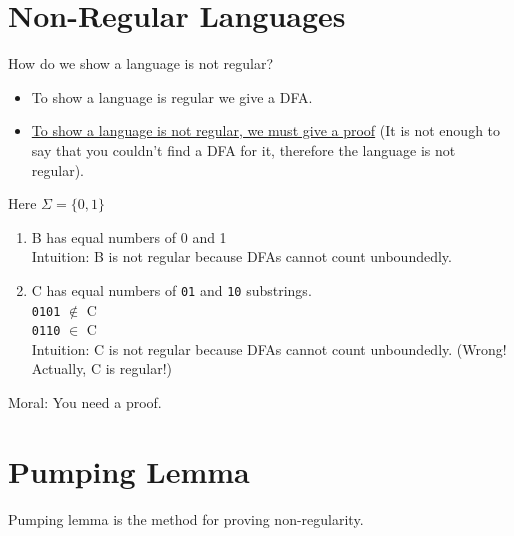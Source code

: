 \section{Non-Regular Languages}
How do we show a language is not regular?
\begin{itemize}
    \item To show a language is regular we give a DFA.
    \item \underline{To show a language is not regular, we must give a proof} (It is not enough to say that you couldn't find a DFA for it, therefore the language is not regular).
\end{itemize}

\begin{eg}
    Here \(\Sigma = \{ 0, 1 \} \) 

    \begin{enumerate}
        \item B has equal numbers of 0 and 1\\
        Intuition: B is not regular because DFAs cannot count unboundedly.
        \item C has equal numbers of \verb|01| and \verb|10| substrings.\\
        \verb|0101| \(\notin\) C \\
        \verb|0110| \(\in\) C\\ 
        Intuition: C is not regular because DFAs cannot count unboundedly. (Wrong! Actually, C is regular!)
    \end{enumerate}

    Moral: You need a proof.
\end{eg}


\section{Pumping Lemma}
Pumping lemma is the method for proving non-regularity.

